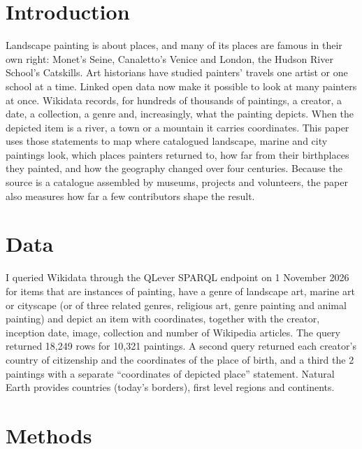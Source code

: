 \documentclass[11pt,a4paper]{article}
\begin{document}
\section{Introduction}
Landscape painting is about places, and many of its places are famous in their own right: Monet's Seine, Canaletto's Venice and London, the Hudson River School's Catskills. Art historians have studied painters' travels one artist or one school at a time. Linked open data now make it possible to look at many painters at once. Wikidata records, for hundreds of thousands of paintings, a creator, a date, a collection, a genre and, increasingly, what the painting depicts. When the depicted item is a river, a town or a mountain it carries coordinates. This paper uses those statements to map where catalogued landscape, marine and city paintings look, which places painters returned to, how far from their birthplaces they painted, and how the geography changed over four centuries. Because the source is a catalogue assembled by museums, projects and volunteers, the paper also measures how far a few contributors shape the result.

\section{Data}
I queried Wikidata \citep{wikidata} through the QLever SPARQL endpoint \citep{qlever} on 1 November 2026 for items that are instances of painting, have a genre of landscape art, marine art or cityscape (or of three related genres, religious art, genre painting and animal painting) and depict an item with coordinates, together with the creator, inception date, image, collection and number of Wikipedia articles. The query returned 18,249 rows for 10,321 paintings. A second query returned each creator's country of citizenship and the coordinates of the place of birth, and a third the 2 paintings with a separate ``coordinates of depicted place'' statement. Natural Earth \citep{naturalearth} provides countries (today's borders), first level regions and continents.

\section{Methods}
\end{document}
